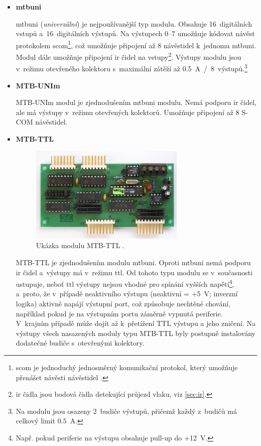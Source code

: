 \begin{itemize}
\item \textbf{\gls{mtbuni}}

	\gls{mtbuni} (\textit{univerzální}) je nejpoužívanější typ modulu. Obsahuje
	16~digitálních vstupů a~16~digitálních výstupů. Na výstupech 0–7 umožňuje
	kódovat návěst protokolem \gls{scom}\footnote{\gls{scom} je jednoduchý jednosměrný
	komunikační protokol, který umožňuje přenášet návěsti návěstidel
	\cite{scom-specs}.}, což umožňuje připojení až 8 návěstidel k~jednomu
	\gls{mtbuni}. Modul dále umožňuje připojení \gls{ir} čidel na
	vstupy\footnote{\gls{ir} čidla jsou bodová čidla detekující průjezd vlaku, viz
	\ref{sec:ir}.}. Výstupy modulu jsou v~režimu otevřeného kolektoru
	s~maximální zátěží až 0.5~A~/~8~výstupů.\footnote{Na modulu jsou osazeny
	2~budiče výstupů, přičemž každý z~budičů má celkový limit $0.5$~A.}

\item \textbf{MTB-UNIm}

	MTB-UNIm modul je zjednodušením \gls{mtbuni} modulu. Nemá podporu \gls{ir}
	čidel, ale má výstupy v~režimu otevřených kolektorů. Umožňuje připojení až
	8 S-COM návěstidel.

\item \textbf{MTB-TTL}

	\begin{figure}[ht]
	\includegraphics[width=0.7\textwidth]{data/mtbttl_foto.jpg}
	\caption{Ukázka modulu MTB-TTL \cite{mtb:web}.}
	\label{fig:mtbttl}
	\end{figure}

	MTB-TTL je zjednodušením modulu \gls{mtbuni}. Oproti \gls{mtbuni}
	nemá podporu \gls{ir} čidel a~výstupy má v~režimu \gls{ttl}. Od tohoto typu
	modulu se v~současnosti ustupuje, neboť \gls{ttl} výstupy nejsou vhodné pro
	spínání vyšších napětí\footnote{Např. pokud periferie na výstupu obsahuje
	pull-up do +12~V.}, a~proto, že v~případě neaktivního výstupu (neaktivní =
	+5~V; inverzní logika) aktivně napájí výstupní port, což způsobuje nechtěné
	chování, například pokud je na výstupním portu záměrně vypnutá periferie.
	V~krajním případě může dojít až k~přetížení TTL výstupu a jeho zničení. Na
	výstupy všech nasazených moduly typu MTB-TTL byly postupně instalovány
	dodatečné budiče s~otevřenými kolektory.


\end{itemize}
